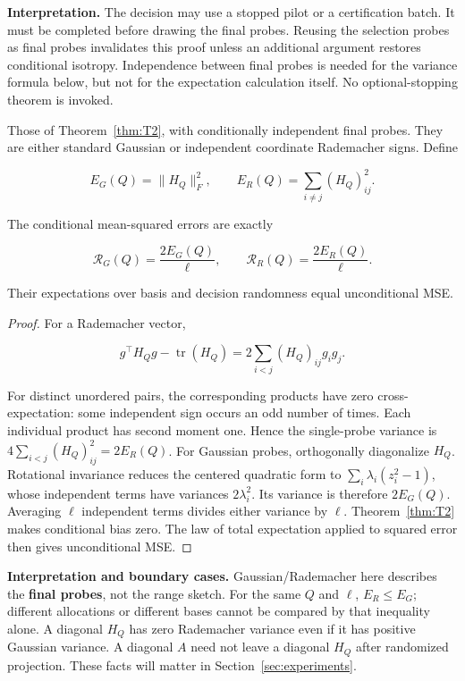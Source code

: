\textbf{Interpretation.} The decision may use a stopped pilot or a certification batch. It must be completed before drawing the final probes. Reusing the selection probes as final probes invalidates this proof unless an additional argument restores conditional isotropy. Independence between final probes is needed for the variance formula below, but not for the expectation calculation itself. No optional-stopping theorem is invoked.

\begin{theorem}\label{thm:T3}
Those of Theorem~\ref{thm:T2}, with conditionally independent final probes. They are either standard Gaussian or independent coordinate Rademacher signs. Define


\begin{equation}
E_G(Q)=\|H_Q\|_F^2,\qquad E_R(Q)=\sum_{i\ne j}(H_Q)_{ij}^2.
\end{equation}


The conditional mean-squared errors are exactly


\begin{equation}
\boxed{\mathcal R_G(Q)=\frac{2E_G(Q)}\ell,
\qquad \mathcal R_R(Q)=\frac{2E_R(Q)}\ell.}
\end{equation}


Their expectations over basis and decision randomness equal unconditional MSE.


\end{theorem}
\begin{proof}
For a Rademacher vector,


\begin{equation}
g^\top H_Qg-\operatorname{tr}(H_Q)
=2\sum_{i<j}(H_Q)_{ij}g_ig_j.
\end{equation}


For distinct unordered pairs, the corresponding products have zero cross-expectation: some independent sign occurs an odd number of times. Each individual product has second moment one. Hence the single-probe variance is $4\sum_{i<j}(H_Q)_{ij}^2=2E_R(Q)$. For Gaussian probes, orthogonally diagonalize $H_Q$. Rotational invariance reduces the centered quadratic form to $\sum_i\lambda_i(z_i^2-1)$, whose independent terms have variances $2\lambda_i^2$. Its variance is therefore $2E_G(Q)$. Averaging $\ell$ independent terms divides either variance by $\ell$. Theorem~\ref{thm:T2} makes conditional bias zero. The law of total expectation applied to squared error then gives unconditional MSE.

\end{proof}


\textbf{Interpretation and boundary cases.} Gaussian/Rademacher here describes the \textbf{final probes}, not the range sketch. For the same $Q$ and $\ell$, $E_R\le E_G$; different allocations or different bases cannot be compared by that inequality alone. A diagonal $H_Q$ has zero Rademacher variance even if it has positive Gaussian variance. A diagonal $A$ need not leave a diagonal $H_Q$ after randomized projection. These facts will matter in Section~\ref{sec:experiments}.


